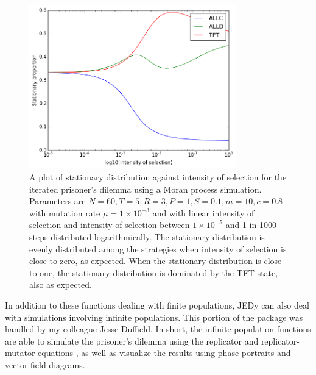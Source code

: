 \begin{figure}[h]
    \centering
    \includegraphics[width = 0.8\textwidth]{graphics/stationarydist}
    \caption{A plot of stationary distribution against intensity of selection for the iterated prisoner's dilemma using a Moran process simulation.
        Parameters are $N = 60, T = 5, R = 3, P = 1, S = 0.1, m = 10, c = 0.8$ with mutation rate $\mu = 1 \times 10^{-3}$ and with linear intensity of selection and intensity of selection between $1 \times 10^{-5}$ and 1 in 1000 steps distributed logarithmically.
        The stationary distribution is evenly distributed among the strategies when intensity of selection is close to zero, as expected.
    When the stationary distribution is close to one, the stationary distribution is dominated by the TFT state, also as expected.}
    \label{stationarydist}
\end{figure}

In addition to these functions dealing with finite populations, JEDy can also deal with simulations involving infinite populations.
This portion of the package was handled by my colleague Jesse Duffield.
In short, the infinite population functions are able to simulate the prisoner's dilemma using the replicator and replicator-mutator equations \cite{imhofetal}, as well as visualize the results using phase portraits and vector field diagrams.
